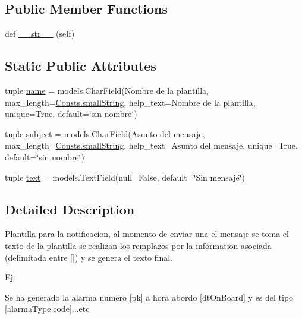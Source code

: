 \subsection*{Public Member Functions}
\begin{DoxyCompactItemize}
\item 
def \hyperlink{class_ground_segment_1_1models_1_1_notification_1_1_message_template_1_1_message_template_a2778ecc4f32ea50d6199ea3411ffcfec}{\+\_\+\+\_\+str\+\_\+\+\_\+} (self)
\end{DoxyCompactItemize}
\subsection*{Static Public Attributes}
\begin{DoxyCompactItemize}
\item 
tuple \hyperlink{class_ground_segment_1_1models_1_1_notification_1_1_message_template_1_1_message_template_a6c324264a61bc988b25b3b25a8196dcd}{name} = models.\+Char\+Field(\textquotesingle{}Nombre de la plantilla\textquotesingle{}, max\+\_\+length=\hyperlink{class_ground_segment_1_1models_1_1_consts_1_1_consts_a3788d24e86a0ffb03efc2a6bb1f88643}{Consts.\+small\+String}, help\+\_\+text=\textquotesingle{}Nombre de la plantilla\textquotesingle{}, unique=True, default=\char`\"{}sin nombre\char`\"{})
\item 
tuple \hyperlink{class_ground_segment_1_1models_1_1_notification_1_1_message_template_1_1_message_template_a4a30265144c01c3f2f44e6fd7d27c663}{subject} = models.\+Char\+Field(\textquotesingle{}Asunto del mensaje\textquotesingle{}, max\+\_\+length=\hyperlink{class_ground_segment_1_1models_1_1_consts_1_1_consts_a3788d24e86a0ffb03efc2a6bb1f88643}{Consts.\+small\+String}, help\+\_\+text=\textquotesingle{}Asunto del mensaje\textquotesingle{}, unique=True, default=\char`\"{}sin nombre\char`\"{})
\item 
tuple \hyperlink{class_ground_segment_1_1models_1_1_notification_1_1_message_template_1_1_message_template_a376fac3f79b54f6690e09fae5e2ea2d5}{text} = models.\+Text\+Field(null=False, default=\char`\"{}Sin mensaje\char`\"{})
\end{DoxyCompactItemize}


\subsection{Detailed Description}
\begin{DoxyVerb}Plantilla para la notificacion, al momento de enviar una el mensaje se toma el texto de la plantilla
se realizan los remplazos por la information asociada (delimitada entre [])  y se genera el texto final.

Ej:

    Se ha generado la alarma numero [pk] a hora abordo [dtOnBoard] y es del tipo [alarmaType.code]...etc
\end{DoxyVerb}
 

